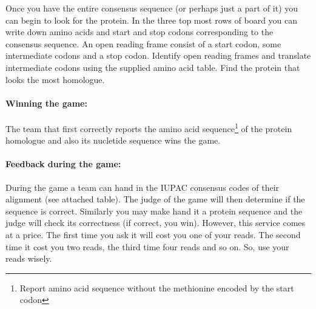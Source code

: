 Once you have the entire  consensus sequence (or perhaps just a part of it) you can begin to look for the protein. In the three top most rows
of board you can write down amino acids and start and stop codons corresponding to the consensus sequence. An open reading frame consist of 
a start codon, some intermediate codons and a stop codon. Identify open reading frames and translate intermediate codons using the supplied 
amino acid table. Find the protein that looks the most homologue. 

\paragraph{Winning the game:}
The team that first correctly reports the amino acid sequence\footnote{Report amino acid sequence without the methionine encoded by the start codon} of the protein homologue and also its nucletide sequence wins the game.

\paragraph{Feedback during the game:} 
During the game a team can hand in the IUPAC consensus codes of their alignment (see attached table).
The judge of the game will then determine if the sequence is correct. Similarly you may make hand it 
a protein sequence and the judge will check its correctness (if correct, you win).  However, this service comes at a price.
The first time you ask it will cost you one of your reads. The second time it cost you two reads, the third time four reads and so on. 
So, use your reads wisely.

